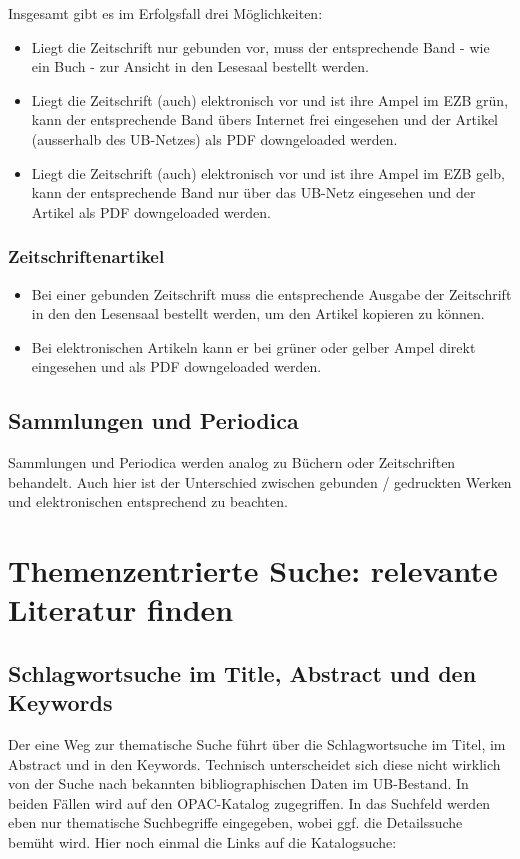 \documentclass[
  DIV=calc,
  BCOR=5mm,
  11pt,
  headings=small,
  oneside,
  abstract=true,
  toc=bib,
  english,ngerman]{scrartcl}
\begin{document}
Insgesamt gibt es im Erfolgsfall drei Möglichkeiten:
\begin{itemize}
  \item Liegt die Zeitschrift nur gebunden vor, muss der entsprechende Band -
  wie ein Buch - zur Ansicht in den Lesesaal bestellt werden.
  \item Liegt die Zeitschrift (auch) elektronisch vor und ist ihre Ampel im
  EZB grün, kann der entsprechende Band übers Internet frei eingesehen und der
  Artikel (ausserhalb des UB-Netzes) als PDF downgeloaded werden.
  \item Liegt die Zeitschrift (auch) elektronisch vor und ist ihre Ampel im
  EZB gelb, kann der entsprechende Band nur über das UB-Netz eingesehen und
  der Artikel als PDF downgeloaded werden.
\end{itemize}  
 

\subsubsection{Zeitschriftenartikel}
\begin{itemize}
  \item Bei einer gebunden Zeitschrift muss die entsprechende Ausgabe der
  Zeitschrift in den den Lesensaal bestellt werden, um den Artikel kopieren zu
  können.
  \item Bei elektronischen Artikeln kann er bei grüner oder gelber Ampel
  direkt eingesehen und als PDF downgeloaded werden.
\end{itemize}

\subsection{Sammlungen und Periodica}

Sammlungen und Periodica werden analog zu Büchern oder Zeitschriften behandelt.
Auch hier ist der Unterschied zwischen gebunden / gedruckten Werken und
elektronischen entsprechend zu beachten.

\section{Themenzentrierte Suche: relevante Literatur finden }

\subsection{Schlagwortsuche im Title, Abstract und den Keywords}
Der eine Weg zur thematische Suche führt über die Schlagwortsuche im Titel, im
Abstract und in den Keywords. Technisch unterscheidet sich diese nicht wirklich
von der Suche nach bekannten bibliographischen Daten im UB-Bestand. In beiden
Fällen wird auf den OPAC-Katalog zugegriffen. In das Suchfeld werden eben nur
thematische Suchbegriffe eingegeben, wobei ggf. die Detailssuche bemüht wird.
Hier noch einmal die Links auf die Katalogsuche:
\end{document}
